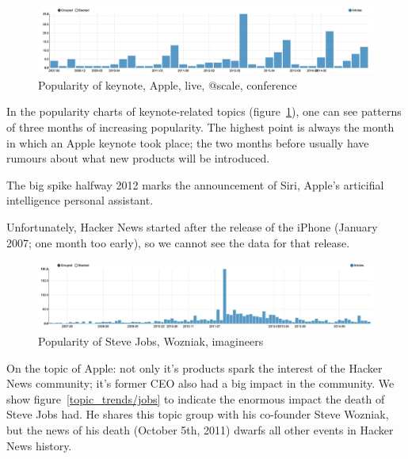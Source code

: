 \begin{figure}[H]
	\caption{Popularity of keynote, Apple, live, @scale, conference}
	\label{fig:trend_keynote}
	\centering
	\includegraphics[width=14cm]{topic_trends/keynote}
\end{figure}
In the popularity charts of keynote-related topics (figure~\ref{fig:trend_keynote}), one can see patterns of three months of increasing popularity. The highest point is always the month in which an Apple keynote took place; the two months before usually have rumours about what new products will be introduced.

The big spike halfway 2012 marks the announcement of Siri, Apple's articifial intelligence personal assistant.

Unfortunately, Hacker News started after the release of the iPhone (January 2007; one month too early), so we cannot see the data for that release.

\begin{figure}[H]
	\caption{Popularity of Steve Jobs, Wozniak, imagineers}
	\label{fig:trend_jobs}
	\centering
	\includegraphics[width=14cm]{topic_trends/jobs}
\end{figure}

On the topic of Apple: not only it's products spark the interest of the Hacker News community; it's former CEO also had a big impact in the community. We show figure~\ref{topic_trends/jobs} to indicate the enormous impact the death of Steve Jobs had. He shares this topic group with his co-founder Steve Wozniak, but the news of his death (October 5th, 2011) dwarfs all other events in Hacker News history.

